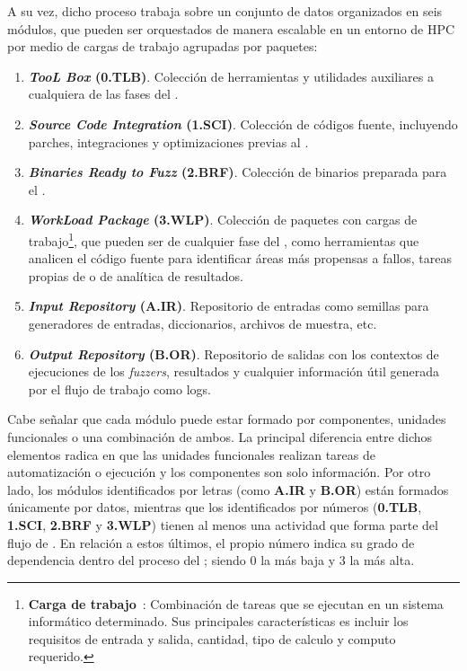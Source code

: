 \documentclass[10pt,conference,a4paper]{IEEEtran}
\begin{document}
A su vez, dicho proceso trabaja sobre un conjunto de datos organizados en seis módulos, que pueden ser orquestados de manera escalable en un entorno de HPC por medio de cargas de trabajo agrupadas por paquetes:

%

\begin{enumerate}
\item \textbf{\textit{TooL Box} (0.TLB)}.
    Colección de herramientas y utilidades auxiliares a cualquiera de las fases del {\fz}.

\item \textbf{\textit{Source Code Integration} (1.SCI)}.
    Colección de códigos fuente, incluyendo parches, integraciones y optimizaciones previas al {\fz}.
\item \textbf{\textit{Binaries Ready to Fuzz} (2.BRF)}.
    Colección de binarios preparada para el {\fz}.
\item \textbf{\textit{WorkLoad Package} (3.WLP)}.
    Colección de paquetes con cargas de trabajo\footnote{\textbf{Carga de trabajo}~\cite{IEEE_SW_standar}: Combinación de tareas que se ejecutan en un sistema informático determinado. Sus principales características es incluir los requisitos de entrada y salida, cantidad, tipo de calculo y computo requerido.}, que pueden ser de cualquier fase del {\fz}, como herramientas que analicen el código fuente para identificar áreas más propensas a fallos, tareas propias de {\fz} o de analítica de resultados.
\item \textbf{\textit{Input Repository }(A.IR)}.
    Repositorio de entradas como semillas para generadores de entradas, diccionarios, archivos de muestra, etc.
\item \textbf{\textit{Output Repository }(B.OR)}.
    Repositorio de salidas con los contextos de ejecuciones de los \textit{fuzzers}, resultados y cualquier información útil generada por el flujo de trabajo como logs.
\end{enumerate} 
 
Cabe señalar que cada módulo puede estar formado por componentes, unidades funcionales o una combinación de ambos. La principal diferencia entre dichos elementos radica en que las unidades funcionales realizan tareas de automatización o ejecución y los componentes son solo información.
Por otro lado, los módulos identificados por letras (como \textbf{A.IR} y \textbf{B.OR}) están formados únicamente por datos, mientras que los identificados por números (\textbf{0.TLB}, \textbf{1.SCI}, \textbf{2.BRF} y \textbf{3.WLP}) tienen al menos una actividad que forma parte del flujo de {\fz}. En relación a estos últimos, el propio número indica su grado de dependencia dentro del proceso del {\fz}; siendo 0 la más baja y 3 la más alta.
\end{document}
